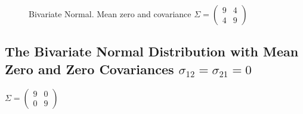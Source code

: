 \documentclass[
  letterpaper,
  DIV=11,
  numbers=noendperiod]{scrreprt}
\begin{document}
\begin{figure}[H]


\caption{\label{fig-bi90403d}Bivariate Normal. Mean zero and covariance
\(\Sigma=\begin{pmatrix} 9 & 4 \\ 4 & 9\end{pmatrix}\)}

\end{figure}%

\subsection{\texorpdfstring{The Bivariate Normal Distribution with Mean
Zero and Zero Covariances
\(\sigma_{12} = \sigma_{21} = 0\)}{The Bivariate Normal Distribution with Mean Zero and Zero Covariances \textbackslash sigma\_\{12\} = \textbackslash sigma\_\{21\} = 0}}\label{the-bivariate-normal-distribution-with-mean-zero-and-zero-covariances-sigma_12-sigma_21-0}

\(\Sigma=\begin{pmatrix} 9 & 0 \\ 0 & 9\end{pmatrix}\)
\end{document}
